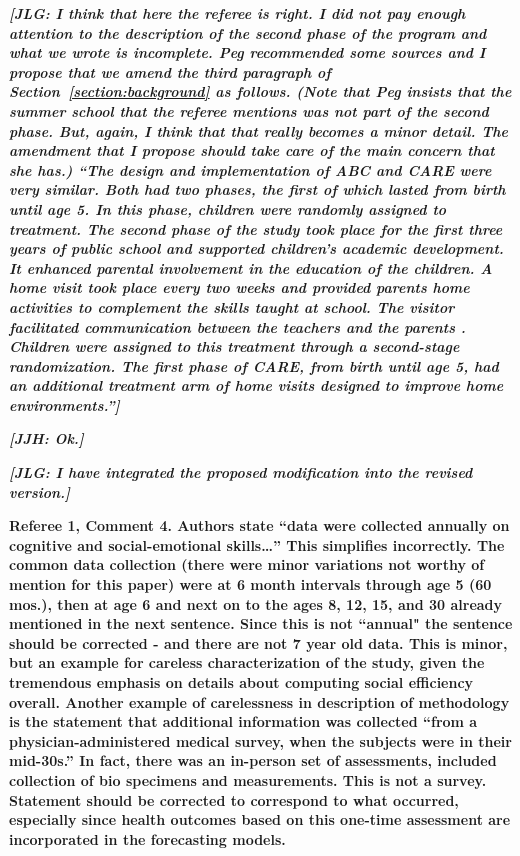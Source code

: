 \textit{\textbf{[JLG: I think that here the referee is right. I did not pay enough attention to the description of the second phase of the program and what we wrote is incomplete. Peg recommended some sources and I propose that we amend the third paragraph of Section~\ref{section:background} as follows. (Note that Peg insists that the summer school that the referee mentions was not part of the second phase. But, again, I think that that really becomes a minor detail. The amendment that I propose should take care of the main concern that she has.) ``The design and implementation of ABC and CARE were very similar. Both had two phases, the first of which lasted from birth until age 5. In this phase, children were randomly assigned to treatment. The second phase of the study took place for the first three years of public school and supported children's academic development. It enhanced parental involvement in the education of the children. A home visit took place every two weeks and provided parents home activities to complement the skills taught at school. The visitor facilitated communication between the teachers and the parents \citep{Campbell_Ramey_1995_AERJ}. Children were assigned to this treatment through a second-stage randomization. The first phase of CARE, from birth until age 5, had an additional treatment arm of home visits designed to improve home environments.'']}}  

\textit{\textbf{[JJH: Ok.]}}

\textit{\textbf{[JLG: I have integrated the proposed modification into the revised version.]}}

\noindent \textbf{Referee 1, Comment 4. Authors state ``data were collected annually on cognitive and social-emotional skills…'' This simplifies incorrectly. The common data collection (there were minor variations not worthy of mention for this paper) were at 6 month intervals through age 5 (60 mos.), then at age 6 and next on to the ages 8, 12, 15, and 30 already mentioned in the next sentence. Since this is not ``annual" the sentence should be corrected - and there are not 7 year old data. This is minor, but an example for careless characterization of the study, given the tremendous emphasis on details about computing social efficiency overall. Another example of carelessness in description of methodology is the statement that additional information was collected ``from a physician-administered medical survey, when the subjects were in their mid-30s.'' In fact, there was an in-person set of assessments, included collection of bio specimens and measurements. This is not a survey. Statement should be corrected to correspond to what occurred, especially since health outcomes based on this one-time assessment are incorporated in the forecasting models.} 

